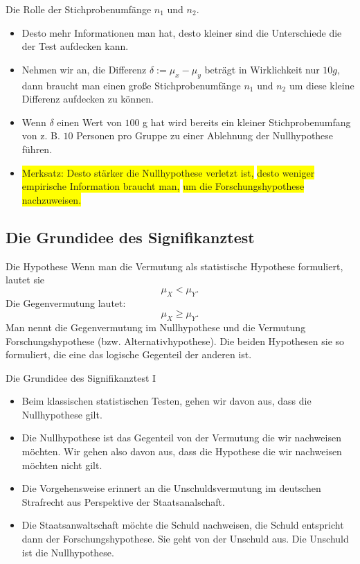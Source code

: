 \documentclass[usenames,dvipsnames,handout]{beamer}
\begin{document}
\begin{frame}{Die Rolle der Stichprobenumfänge $n_{1}$ und $n_{2}.$}
\begin{itemize}
\item{Desto mehr Informationen man hat, desto kleiner sind die Unterschiede die der Test aufdecken kann.}\pause
\item{Nehmen wir an, die Differenz $\delta := \mu_{x}-\mu_{y}$ beträgt in Wirklichkeit nur $10g,$ dann braucht man
einen große Stichprobenumfänge $n_{1}$ und $n_{2}$ um diese kleine Differenz aufdecken zu können.}\pause
\item{Wenn $\delta$ einen Wert von $100$ g hat wird bereits ein kleiner Stichprobenumfang von z. B. $10$
Personen pro Gruppe zu einer Ablehnung der Nullhypothese führen.}\pause
\item{\colorbox{yellow}{Merksatz: Desto stärker die Nullhypothese verletzt ist,} 
\colorbox{yellow}{desto weniger empirische Information braucht man,}
\colorbox{yellow}{um die Forschungshypothese nachzuweisen.}}
\end{itemize}
\end{frame}
\subsection{Die Grundidee des Signifikanztest}
\begin{frame}{Die Hypothese}
Wenn man die Vermutung als statistische Hypothese formuliert, lautet sie
$$
\mu_{X} < \mu_{Y}.
$$
Die Gegenvermutung lautet:
$$
\mu_{X} \geq \mu_{Y}.
$$
Man nennt die Gegenvermutung im  Nullhypothese und die Vermutung Forschungshypothese (bzw. Alternativhypothese).
Die beiden Hypothesen sie so formuliert, die eine das logische Gegenteil der anderen ist.

\end{frame}

\begin{frame}{Die Grundidee des Signifikanztest I}
\begin{itemize}
\item{Beim klassischen statistischen Testen, gehen wir davon aus, dass die Nullhypothese gilt.}\pause
\item{Die Nullhypothese ist das Gegenteil von der Vermutung die wir nachweisen möchten. Wir gehen also davon aus,
dass die Hypothese die wir nachweisen möchten nicht gilt.}\pause
\item{Die Vorgehensweise erinnert an die Unschuldsvermutung im deutschen Strafrecht aus Perspektive der Staatsanalschaft.}\pause
\item{Die Staatsanwaltschaft möchte die Schuld nachweisen, die Schuld entspricht dann der Forschungshypothese.
Sie geht von der Unschuld aus. Die Unschuld ist die Nullhypothese.}
\end{itemize}
\end{frame}
\end{document}
